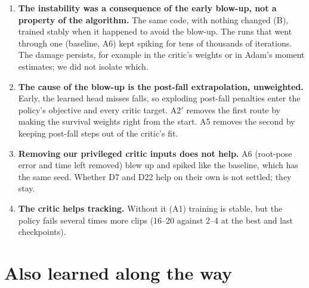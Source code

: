\documentclass[10pt]{article}
\begin{document}
\begin{enumerate}
  \item \textbf{The instability was a consequence of the early blow-up, not a property of the
  algorithm.} The same code, with nothing changed (B), trained stably when it happened to avoid the
  blow-up. The runs that went through one (baseline, A6) kept spiking for tens of thousands of
  iterations. The damage persists, for example in the critic's weights or in Adam's moment estimates;
  we did not isolate which.
  \item \textbf{The cause of the blow-up is the post-fall extrapolation, unweighted.} Early, the learned
  head misses falls, so exploding post-fall penalties enter the policy's objective and every critic
  target. A2$'$ removes the first route by making the survival weights right from the start. A5 removes
  the second by keeping post-fall steps out of the critic's fit.
  \item \textbf{Removing our privileged critic inputs does not help.} A6 (root-pose error and time
  left removed) blew up and spiked like the baseline, which has the same seed. Whether D7 and D22 help on
  their own is not settled; they stay.
  \item \textbf{The critic helps tracking.} Without it (A1) training is stable, but the policy fails
  several times more clips (16--20 against 2--4 at the best and last checkpoints).
\end{enumerate}

\section{Also learned along the way}
\end{document}
